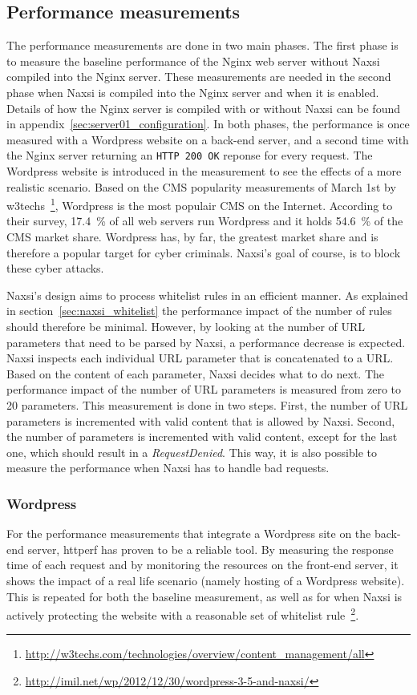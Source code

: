 \documentclass[Methods]{subfiles}
\begin{document}
\subsection{Performance measurements}
The performance measurements are done in two main phases. The first phase is to measure the baseline performance of the Nginx web server without Naxsi compiled into the Nginx server. These measurements are needed in the second phase when Naxsi is compiled into the Nginx server and when it is enabled. Details of how the Nginx server is compiled with or without Naxsi can be found in appendix~\ref{sec:server01_configuration}. In both phases, the performance is once measured with a Wordpress website on a back-end server, and a second time with the Nginx server returning an \verb+HTTP 200 OK+ reponse for every request. The Wordpress website is introduced in the measurement to see the effects of a more realistic scenario. Based on the \ac{CMS} popularity measurements of March 1st by w3techs~\footnote{\url{http://w3techs.com/technologies/overview/content_management/all}}, Wordpress is the most populair \ac{CMS} on the Internet. According to their survey, 17.4~\% of all web servers run Wordpress and it holds 54.6~\% of the CMS market share. Wordpress has, by far, the greatest market share and is therefore a popular target for cyber criminals. Naxsi's goal of course, is to block these cyber attacks.

Naxsi's design aims to process whitelist rules in an efficient manner. As explained in section~\ref{sec:naxsi_whitelist} the performance impact of the number of rules should therefore be minimal. However, by looking at the number of \ac{URL} parameters that need to be parsed by Naxsi, a performance decrease is expected. Naxsi inspects each individual \ac{URL} parameter that is concatenated to a \ac{URL}. Based on the content of each parameter, Naxsi decides what to do next. The performance impact of the number of \ac{URL} parameters is measured from zero to 20 parameters. This measurement is done in two steps. First, the number of \ac{URL} parameters is incremented with valid content that is allowed by Naxsi. Second, the number of parameters is incremented with valid content, except for the last one, which should result in a \textit{RequestDenied}. This way, it is also possible to measure the performance when Naxsi has to handle bad requests.

\subsubsection{Wordpress}
For the performance measurements that integrate a Wordpress site on the back-end server, httperf has proven to be a reliable tool. By measuring the response time of each request and by monitoring the resources on the front-end server, it shows the impact of a real life scenario (namely hosting of a Wordpress website). This is repeated for both the baseline measurement, as well as for when Naxsi is actively protecting the website with a reasonable set of whitelist rule~\footnote{\url{http://imil.net/wp/2012/12/30/wordpress-3-5-and-naxsi/}}.
\end{document}
